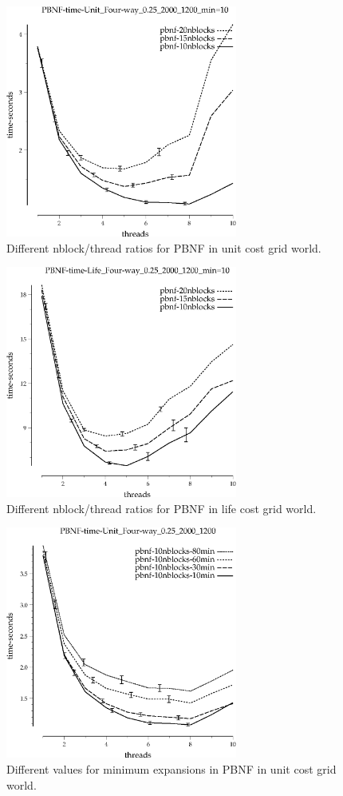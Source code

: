 \documentclass{article}
\begin{document}
\begin{figure}[h!]
\includegraphics[width=3in]{../graphs/grid_unit_four-way_0.25_2000_1200/PBNF-time-Unit_Four-way_0.25_2000_1200_min=10.eps}
\caption{Different nblock/thread ratios for PBNF in unit cost grid world.}
\label{fig:PBNF-nblock-grid}
\end{figure}

\begin{figure}[h!]
\includegraphics[width=3in]{../graphs/grid_life_four-way_0.25_2000_1200/PBNF-time-Life_Four-way_0.25_2000_1200_min=10.eps}
\caption{Different nblock/thread ratios for PBNF in life cost grid world.}
\label{fig:PBNF-nblock-life}
\end{figure}

\begin{figure}[h!]
\includegraphics[width=3in]{../graphs/grid_unit_four-way_0.25_2000_1200/PBNF-time-Unit_Four-way_0.25_2000_1200.eps}
\caption{Different values for minimum expansions in PBNF in unit cost grid world.}
\label{fig:PBNF-min-grid}
\end{figure}
\end{document}
